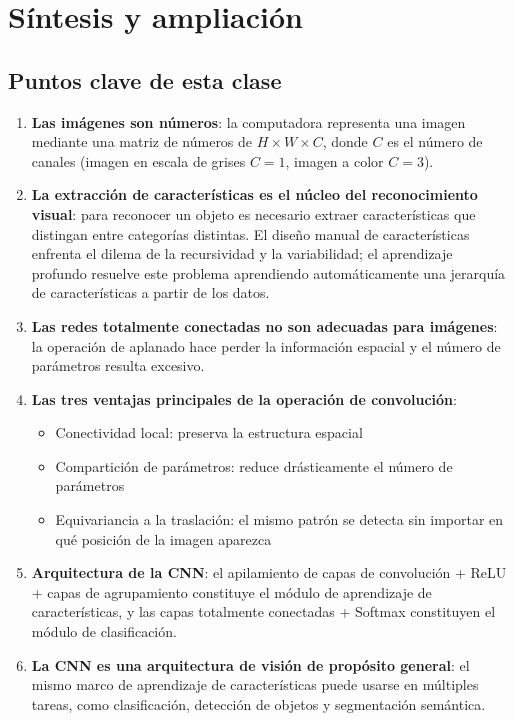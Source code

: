 \section{Síntesis y ampliación}

\subsection{Puntos clave de esta clase}

\begin{enumerate}
    \item \textbf{Las imágenes son números}: la computadora representa una imagen mediante una matriz de números de $H \times W \times C$, donde $C$ es el número de canales (imagen en escala de grises $C=1$, imagen a color $C=3$).

    \item \textbf{La extracción de características es el núcleo del reconocimiento visual}: para reconocer un objeto es necesario extraer características que distingan entre categorías distintas. El diseño manual de características enfrenta el dilema de la recursividad y la variabilidad; el aprendizaje profundo resuelve este problema aprendiendo automáticamente una jerarquía de características a partir de los datos.

    \item \textbf{Las redes totalmente conectadas no son adecuadas para imágenes}: la operación de aplanado hace perder la información espacial y el número de parámetros resulta excesivo.

    \item \textbf{Las tres ventajas principales de la operación de convolución}:
    \begin{itemize}
        \item Conectividad local: preserva la estructura espacial
        \item Compartición de parámetros: reduce drásticamente el número de parámetros
        \item Equivariancia a la traslación: el mismo patrón se detecta sin importar en qué posición de la imagen aparezca
    \end{itemize}

    \item \textbf{Arquitectura de la CNN}: el apilamiento de capas de convolución + ReLU + capas de agrupamiento constituye el módulo de aprendizaje de características, y las capas totalmente conectadas + Softmax constituyen el módulo de clasificación.

    \item \textbf{La CNN es una arquitectura de visión de propósito general}: el mismo marco de aprendizaje de características puede usarse en múltiples tareas, como clasificación, detección de objetos y segmentación semántica.
\end{enumerate}

